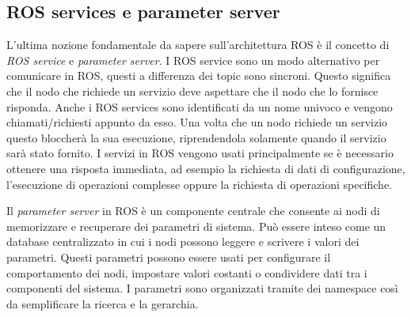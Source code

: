 \subsection{ROS services e parameter server}
\label{subsec:servandparam}
L'ultima nozione fondamentale da sapere sull'architettura ROS è il concetto di \textit{ROS service} e \textit{parameter server}. I ROS service sono un modo alternativo per comunicare in ROS, questi a differenza dei topic sono sincroni. Questo significa che il nodo che richiede un servizio deve aspettare che il nodo che lo fornisce risponda. 
Anche i ROS services sono identificati da un nome univoco e vengono chiamati/richiesti appunto da esso. Una volta che un nodo richiede un servizio questo bloccherà la sua esecuzione, riprendendola solamente quando il servizio sarà stato fornito.
I servizi in ROS vengono usati principalmente se è necessario ottenere una risposta immediata, ad esempio la richiesta di dati di configurazione, l'esecuzione di operazioni complesse oppure la richiesta di operazioni specifiche.

Il \textit{parameter server} in ROS è un componente centrale che consente ai nodi di memorizzare e recuperare dei parametri di sistema. Può essere inteso come un database centralizzato in cui i nodi possono leggere e scrivere i valori dei parametri.
Questi parametri possono essere usati per configurare il comportamento dei nodi, impostare valori costanti o condividere dati tra i componenti del sistema. I parametri sono organizzati tramite dei namespace così da semplificare la ricerca e la gerarchia.

